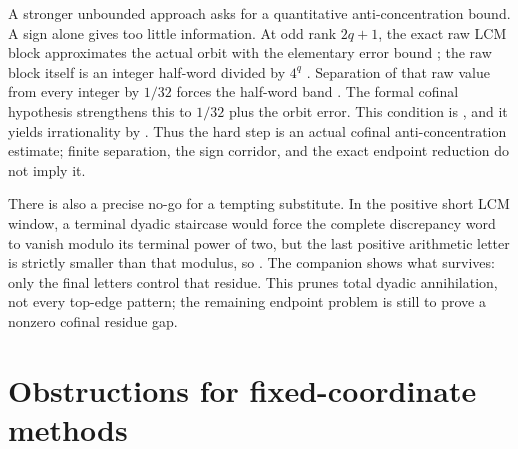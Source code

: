 A stronger unbounded approach asks for a quantitative anti-concentration
bound.  A sign alone gives too little information.  At odd rank \(2q+1\), the exact raw
LCM block approximates the actual orbit with the elementary error bound
;
the raw block itself is an integer half-word divided by \(4^q\)
.
Separation of that raw value from every integer by \(1/32\) forces the
half-word band
.
The formal cofinal hypothesis strengthens this to \(1/32\) plus the orbit
error. This condition is
,
and it yields irrationality by
.
Thus the hard step is an actual cofinal anti-concentration estimate; finite
separation, the sign corridor, and the exact endpoint reduction do not imply
it.

There is also a precise no-go for a tempting substitute.  In the positive
short LCM window, a terminal dyadic staircase would force the complete
discrepancy word to vanish modulo its terminal power of two, but the last
positive arithmetic letter is strictly smaller than that modulus, so
.
The companion
shows what survives: only the final letters control that residue.  This
prunes total dyadic annihilation, not every top-edge pattern; the remaining
endpoint problem is still to prove a nonzero cofinal residue gap.



\section{Obstructions for fixed-coordinate methods}\label{sec:nogo}

